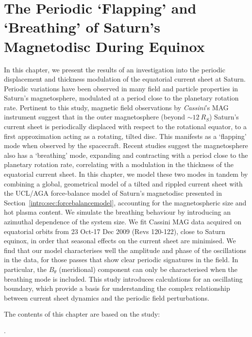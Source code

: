 \chapter[The Periodic Flapping and Breathing of Saturn's Magnetodisc]{The Periodic `Flapping' and `Breathing' of Saturn's Magnetodisc During Equinox}
\label{chap:equinox}
In this chapter, we present the results of an investigation into the periodic displacement and thickness modulation of the equatorial current sheet at Saturn. Periodic variations have been observed in many field and particle properties in Saturn's magnetosphere, modulated at a period close to the planetary rotation rate. Pertinent to this study, magnetic field observations by \textit{Cassini}'s MAG instrument suggest that in the outer magnetosphere (beyond ${\sim}\SI{12}{R_S}$) Saturn's current sheet is periodically displaced with respect to the rotational equator, to a first approximation acting as a rotating, tilted disc. This manifests as a `flapping' mode when observed by the spacecraft. Recent studies suggest the magnetosphere also has a `breathing' mode, expanding and contracting with a period close to the planetary rotation rate, correlating with a modulation in the thickness of the equatorial current sheet. In this chapter, we model these two modes in tandem by combining a global, geometrical model of a tilted and rippled current sheet with the UCL/AGA force-balance model of Saturn's magnetodisc presented in Section~\ref{intro:sec:forcebalancemodel}, accounting for the magnetospheric size and hot plasma content. We simulate the breathing behaviour by introducing an azimuthal dependence of the system size. We fit Cassini MAG data acquired on equatorial orbits from 23 Oct{\--}17 Dec 2009 (Revs 120{\--}122), close to Saturn equinox, in order that seasonal effects on the current sheet are minimised. We find that our model characterises well the amplitude and phase of the oscillations in the data, for those passes that show clear periodic signatures in the field. In particular, the $B_\theta$ (meridional) component can only be characterised when the breathing mode is included. This study introduces calculations for an oscillating boundary, which provide a basis for understanding the complex relationship between current sheet dynamics and the periodic field perturbations. 

The contents of this chapter are based on the study:

.

